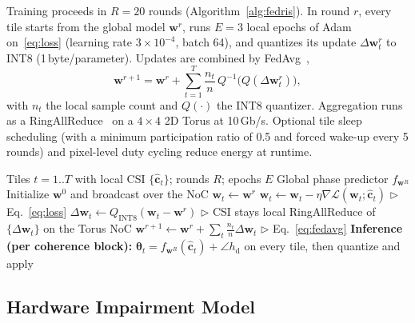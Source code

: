 \documentclass[conference]{IEEEtran}
\newcommand{\fedris}{Fed-RIS}
\begin{document}
Training proceeds in $R=20$ rounds (Algorithm~\ref{alg:fedris}). In round $r$, every tile starts from the global model $\bm{w}^r$, runs $E=3$ local epochs of Adam on~\eqref{eq:loss} (learning rate $3\times10^{-4}$, batch 64), and quantizes its update $\Delta\bm{w}_t^r$ to INT8 (1\,byte/parameter). Updates are combined by FedAvg~\cite{mcmahan2017},
\begin{equation}
\bm{w}^{r+1} = \bm{w}^{r} + \sum_{t=1}^{T}\frac{n_t}{n}\,Q^{-1}\!\big(Q(\Delta\bm{w}_t^r)\big),
\label{eq:fedavg}
\end{equation}
with $n_t$ the local sample count and $Q(\cdot)$ the INT8 quantizer. Aggregation runs as a RingAllReduce~\cite{patarasuk2009} on a $4\times4$ 2D Torus at 10\,Gb/s. Optional tile sleep scheduling (with a minimum participation ratio of 0.5 and forced wake-up every 5 rounds) and pixel-level duty cycling reduce energy at runtime.

\begin{algorithm}[t]
\caption{\fedris{}: Federated phase learning across RIS tiles}
\label{alg:fedris}
\begin{algorithmic}[1]
\REQUIRE Tiles $t=1..T$ with local CSI $\{\hat{\bm{c}}_t\}$; rounds $R$; epochs $E$
\ENSURE Global phase predictor $f_{\bm{w}^R}$
\STATE Initialize $\bm{w}^0$ and broadcast over the NoC
    \STATE $\bm{w}_t \leftarrow \bm{w}^r$
      \STATE $\bm{w}_t \leftarrow \bm{w}_t - \eta\nabla\mathcal{L}(\bm{w}_t;\hat{\bm{c}}_t)$ \hfill $\triangleright$ Eq.~\eqref{eq:loss}
    \ENDFOR
    \STATE $\Delta\bm{w}_t \leftarrow Q_\text{INT8}(\bm{w}_t-\bm{w}^r)$ \hfill $\triangleright$ CSI stays local
  \ENDFOR
  \STATE RingAllReduce of $\{\Delta\bm{w}_t\}$ on the Torus NoC
  \STATE $\bm{w}^{r+1} \leftarrow \bm{w}^r + \sum_t \frac{n_t}{n}\Delta\bm{w}_t$ \hfill $\triangleright$ Eq.~\eqref{eq:fedavg}
\ENDFOR
\STATE \textbf{Inference (per coherence block):} $\bm{\theta}_t = f_{\bm{w}^R}(\hat{\bm{c}}_t) + \angle h_\text{d}$ on every tile, then quantize and apply
\end{algorithmic}
\end{algorithm}

\subsection{Hardware Impairment Model}
\end{document}
